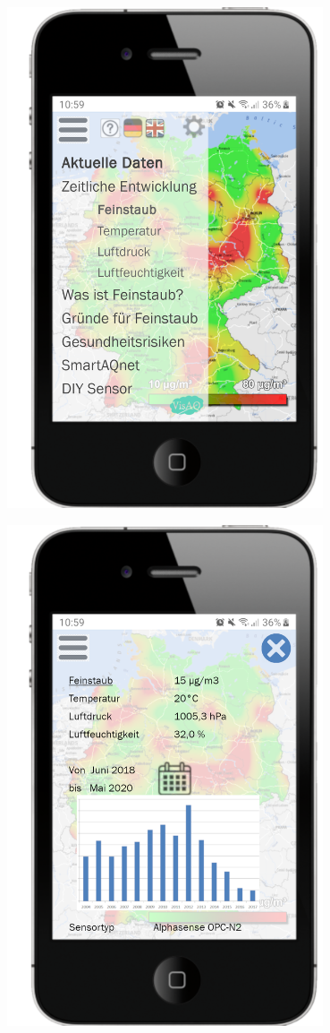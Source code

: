 	\begin{minipage}[b]{.5\linewidth} %
		\includegraphics[width=0.7\textwidth]{media/Menue-Mobile-Version} 
	\end{minipage}
	\begin{minipage}[b]{.5\linewidth} %
		\includegraphics[width=0.7\textwidth]{media/AktuelleDaten-Mobile-Version} 
	\end{minipage}


